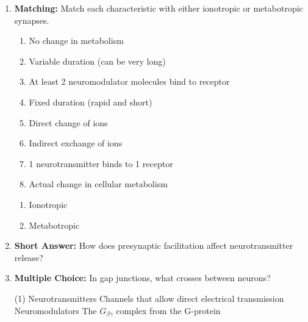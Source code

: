 \begin{enumerate}[label=\textbf{Q2.5.\arabic*}]
      \item \textbf{Matching:} Match each characteristic with either ionotropic or metabotropic synapses.
            \begin{wordbox}
                  \begin{enumerate}[label=(\alph*)]
                        \item No change in metabolism
                        \item Variable duration (can be very long)
                        \item At least 2 neuromodulator molecules bind to receptor
                        \item Fixed duration (rapid and short)
                        \item Direct change of ions
                        \item Indirect exchange of ions
                        \item 1 neurotransmitter binds to 1 receptor
                        \item Actual change in cellular metabolism
                  \end{enumerate}
            \end{wordbox}
            \begin{enumerate}[label=(\arabic*)]
                  \item Ionotropic \quad \dotfill \quad \underline{\hspace{3cm}} \\ 
                  \item Metabotropic \quad \dotfill \quad \underline{\hspace{3cm}} \\
            \end{enumerate}
                        
      \item \textbf{Short Answer:} How does presynaptic facilitation affect neurotransmitter release? \\
            
      \item \textbf{Multiple Choice:} In gap junctions, what crosses between neurons?
            \begin{tasks}[label=\textcolor{draculafg}{(\Alph*)}, item-format=\color{draculafg}, label-width=1.5em, item-indent=1.7em](1)
                  \task Neurotransmitters
                  \task Channels that allow direct electrical transmission
                  \task Neuromodulators
                  \task The \(G_{\beta\gamma}\) complex from the G-protein
            \end{tasks}
            

\end{enumerate}

